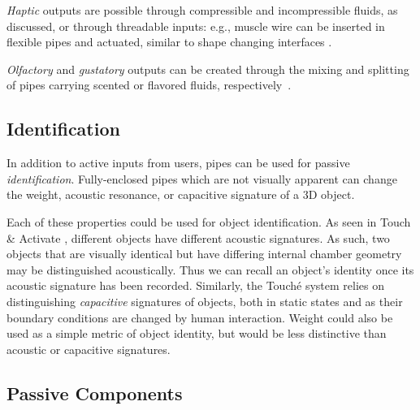 \emph{Haptic} outputs are possible through compressible and incompressible fluids, as discussed, or through threadable inputs: e.g., muscle wire can be inserted in flexible pipes and actuated, similar to shape changing interfaces \cite{Coelho-shapechanging}.

\emph{Olfactory} and \emph{gustatory} outputs can be created through the mixing and splitting of pipes carrying scented or flavored fluids, respectively~\cite{kaye2004making}.

\subsection{Identification}
In addition to active inputs from users, pipes can be used for passive \emph{identification}.  Fully-enclosed pipes which are not visually apparent can change the weight, acoustic resonance, or capacitive signature of a 3D object. 

Each of these properties could be used for object identification. As seen in Touch \& Activate \cite{Ono-touchandactivate}, different objects have different acoustic signatures.  As such, two objects that are visually identical but have differing internal chamber geometry may be distinguished acoustically.  Thus we can recall an object's identity once its acoustic signature has been recorded.  Similarly, the Touch\'{e} system \cite{Sato-touche} relies on distinguishing \emph{capacitive} signatures of objects, both in static states and as their boundary conditions are changed by human interaction. Weight could also be used as a simple metric of object identity, but would be less distinctive than acoustic or capacitive signatures.


\subsection{Passive Components}

